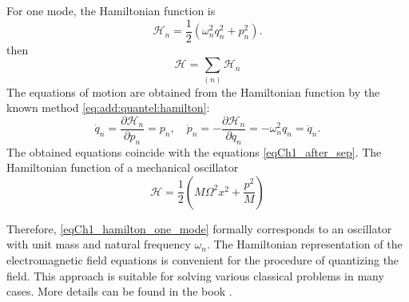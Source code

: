 For one mode, the Hamiltonian function is  
\begin{equation}
\mathcal{H}_n = \frac{1}{2}\left(\omega_n^2 q_n^2 + p_n^2\right).
\label{eqCh1_hamilton_one_mode}
\end{equation}
then
\begin{equation}
\mathcal{H} = \sum_{(n)} \mathcal{H}_n
\label{eqCh1_hamilton_sum_mode}
\end{equation}
The equations of motion are obtained from the Hamiltonian function by the known method \eqref{eq:add:quantel:hamilton}:
\begin{equation}
\dot{q}_n = \frac{\partial \mathcal{H}_n}{\partial p_n} = p_n,
\quad
\dot{p}_n = - \frac{\partial \mathcal{H}_n}{\partial q_n} =
- \omega_n^2 q_n = \ddot{q}_n.
\end{equation}
The obtained equations coincide with the equations \eqref{eqCh1_after_sep}.  
The Hamiltonian function of a mechanical oscillator
\[
\mathcal{H} = \frac{1}{2}\left(M \Omega^2 x^2 + \frac{p^2}{M}\right)
\]

Therefore, \eqref{eqCh1_hamilton_one_mode} formally corresponds to an oscillator with unit mass and natural frequency $\omega_n$. The Hamiltonian representation of the electromagnetic field equations is convenient for the procedure of quantizing the field. This approach is suitable for solving various classical problems in many cases. More details can be found in the book \cite{bCh1Quantel_Gin}.